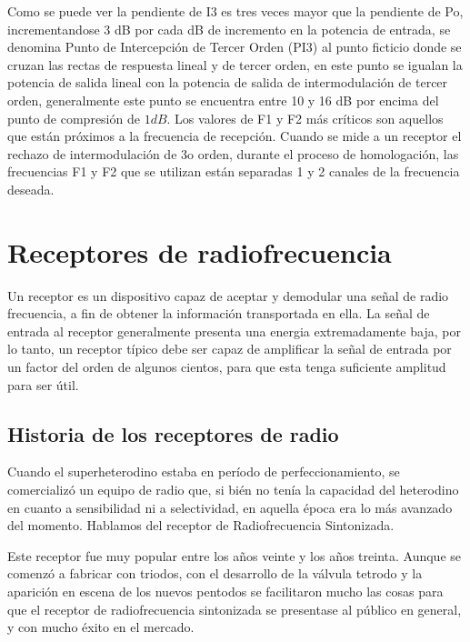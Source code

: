\documentclass[letterpaper,10pt,spanish]{sphinxmanual}
\let\sphinxpxdimen\pdfpxdimen\else\newdimen\sphinxpxdimen
\begin{document}
\sphinxincludegraphics[width=1067\sphinxpxdimen,height=567\sphinxpxdimen]{{linealidad2}.png}

Como se puede ver la pendiente de I3 es tres veces mayor que la pendiente de Po, incrementandose 3 dB por cada dB de incremento en la potencia de entrada, se denomina Punto de Intercepción de Tercer Orden (PI3) al punto ficticio donde se cruzan las rectas de respuesta lineal y de tercer orden, en este punto se igualan la potencia de salida lineal con la potencia de salida de intermodulación de tercer orden, generalmente este punto se encuentra entre 10 y 16 dB por encima del punto de compresión
de \(1 dB\). Los valores de F1 y F2 más críticos son aquellos que están próximos a la frecuencia de recepción. Cuando se mide a un receptor el rechazo de intermodulación de 3o orden, durante el proceso de homologación, las frecuencias F1 y F2 que se utilizan están separadas 1 y 2 canales de la frecuencia deseada.


\chapter{Receptores de radiofrecuencia}
\label{\detokenize{introduccion/sistemas:Receptores-de-radiofrecuencia}}
Un receptor es un dispositivo capaz de aceptar y demodular una señal de radio frecuencia, a fin de obtener la información transportada en ella. La señal de entrada al receptor generalmente presenta una energia extremadamente baja, por lo tanto, un receptor típico debe ser capaz de amplificar la señal de entrada por un factor del orden de algunos cientos, para que esta tenga suficiente amplitud para ser útil.


\section{Historia de los receptores de radio}
\label{\detokenize{introduccion/sistemas:Historia-de-los-receptores-de-radio}}
Cuando el superheterodino estaba en período de perfeccionamiento, se comercializó un equipo de radio que, si bién no tenía la capacidad del heterodino en cuanto a sensibilidad ni a selectividad, en aquella época era lo más avanzado del momento. Hablamos del receptor de Radiofrecuencia Sintonizada.

Este receptor fue muy popular entre los años veinte y los años treinta. Aunque se comenzó a fabricar con triodos, con el desarrollo de la válvula tetrodo y la aparición en escena de los nuevos pentodos se facilitaron mucho las cosas para que el receptor de radiofrecuencia sintonizada se presentase al público en general, y con mucho éxito en el mercado.
\end{document}
